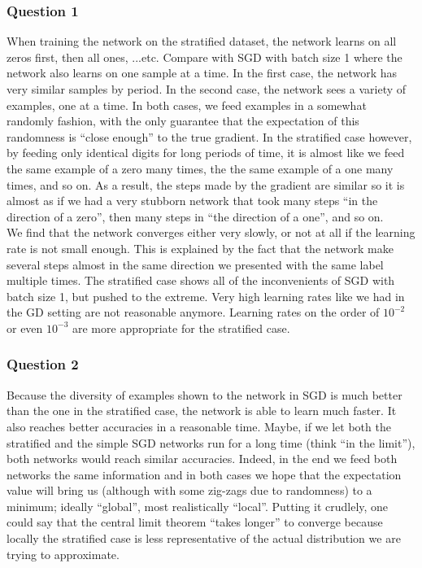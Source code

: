 \documentclass[12pt]{article}
\begin{document}
\subsubsection{Question 1}
When training the network on the stratified dataset, the network learns on all zeros first, then all ones, ...etc. Compare with SGD with batch size 1 where the network also learns on one sample at a time. In the first case, the network has very similar samples by period. In the second case, the network sees a variety of examples, one at a time. In both cases, we feed examples in a somewhat randomly fashion, with the only guarantee that the expectation of this randomness is ``close enough'' to the true gradient. In the stratified case however, by feeding only identical digits for long periods of time, it is almost like we feed the same example of a zero many times, the the same example of a one many times, and so on. As a result, the steps made by the gradient are similar so it is almost as if we had a very stubborn network that took many steps ``in the direction of a zero'', then many steps in ``the direction of a one'', and so on. \\
We find that the network converges either very slowly, or not at all if the learning rate is not small enough. This is explained by the fact that the network make several steps almost in the same direction we presented with the same label multiple times. The stratified case shows all of the inconvenients of SGD with batch size 1, but pushed to the extreme. Very high learning rates like we had in the GD setting are not reasonable anymore. Learning rates on the order of $10^{-2}$ or even $10^{-3}$ are more appropriate for the stratified case.

\subsubsection{Question 2}
Because the diversity of examples shown to the network in SGD is much better than the one in the stratified case, the network is able to learn much faster. It also reaches better accuracies in a reasonable time. Maybe, if we let both the stratified and the simple SGD networks run for a long time (think ``in the limit''), both networks would reach similar accuracies. Indeed, in the end we feed both networks the same information and in both cases we hope that the expectation value will bring us (although with some zig-zags due to randomness) to a minimum; ideally ``global'', most realistically ``local''. Putting it crudlely, one could say that the central limit theorem ``takes longer'' to converge because locally the stratified case is less representative of the actual distribution we are trying to approximate.
\end{document}
